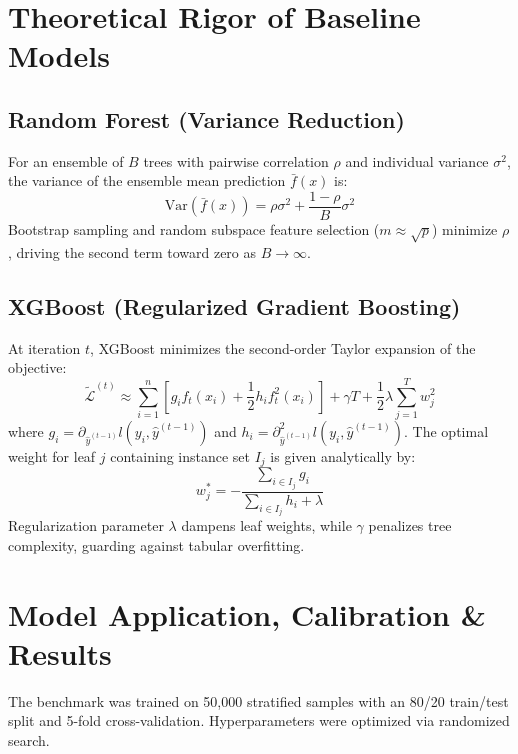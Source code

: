 \documentclass[conference]{IEEEtran}
\begin{document}
\section{Theoretical Rigor of Baseline Models}
\subsection{Random Forest (Variance Reduction)}
For an ensemble of $B$ trees with pairwise correlation $\rho$ and individual variance $\sigma^2$, the variance of the ensemble mean prediction $\bar{f}(x)$ is:
\begin{equation}
\text{Var}(\bar{f}(x)) = \rho \sigma^2 + \frac{1 - \rho}{B} \sigma^2
\end{equation}
Bootstrap sampling and random subspace feature selection ($m \approx \sqrt{p}$) minimize $\rho$, driving the second term toward zero as $B \to \infty$.

\subsection{XGBoost (Regularized Gradient Boosting)}
At iteration $t$, XGBoost minimizes the second-order Taylor expansion of the objective:
\begin{equation}
\tilde{\mathcal{L}}^{(t)} \approx \sum_{i=1}^n \left[ g_i f_t(x_i) + \frac{1}{2} h_i f_t^2(x_i) \right] + \gamma T + \frac{1}{2} \lambda \sum_{j=1}^T w_j^2
\end{equation}
where $g_i = \partial_{\hat{y}^{(t-1)}} l(y_i, \hat{y}^{(t-1)})$ and $h_i = \partial^2_{\hat{y}^{(t-1)}} l(y_i, \hat{y}^{(t-1)})$. The optimal weight for leaf $j$ containing instance set $I_j$ is given analytically by:
\begin{equation}
w_j^* = -\frac{\sum_{i \in I_j} g_i}{\sum_{i \in I_j} h_i + \lambda}
\end{equation}
Regularization parameter $\lambda$ dampens leaf weights, while $\gamma$ penalizes tree complexity, guarding against tabular overfitting.

\section{Model Application, Calibration \& Results}
The benchmark was trained on 50,000 stratified samples with an 80/20 train/test split and 5-fold cross-validation. Hyperparameters were optimized via randomized search.
\end{document}
